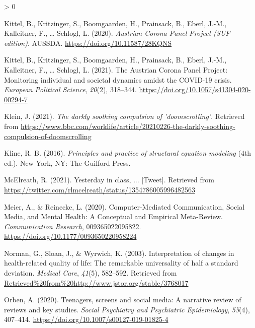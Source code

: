 \documentclass[
  english,
  man,mask,floatsintext]{apa6}
\newlength{\cslhangindent}
\newenvironment{CSLReferences}[2] %
 {%
  \setlength{\parindent}{0pt}
  \ifodd #1 \everypar{\setlength{\hangindent}{\cslhangindent}}\ignorespaces\fi
  \ifnum #2 > 0
  \setlength{\parskip}{#2\baselineskip}
  \fi
 }%
 {}
\begin{document}
\begin{CSLReferences}{1}{0}
\leavevmode\hypertarget{ref-kittelAustrianCoronaPanel2020}{}%
Kittel, B., Kritzinger, S., Boomgaarden, H., Prainsack, B., Eberl, J.-M., Kalleitner, F., \ldots{} Schlogl, L. (2020). \emph{Austrian {Corona} {Panel} {Project} ({SUF} edition)}. AUSSDA. \url{https://doi.org/10.11587/28KQNS}

\leavevmode\hypertarget{ref-kittelAustrianCoronaPanel2021}{}%
Kittel, B., Kritzinger, S., Boomgaarden, H., Prainsack, B., Eberl, J.-M., Kalleitner, F., \ldots{} Schlogl, L. (2021). The {Austrian} {Corona} {Panel} {Project}: Monitoring individual and societal dynamics amidst the {COVID}-19 crisis. \emph{European Political Science}, \emph{20}(2), 318--344. \url{https://doi.org/10.1057/s41304-020-00294-7}

\leavevmode\hypertarget{ref-kleinDarklySoothingCompulsion2021}{}%
Klein, J. (2021). \emph{The darkly soothing compulsion of 'doomscrolling'}. Retrieved from \url{https://www.bbc.com/worklife/article/20210226-the-darkly-soothing-compulsion-of-doomscrolling}

\leavevmode\hypertarget{ref-klinePrinciplesPracticeStructural2016}{}%
Kline, R. B. (2016). \emph{Principles and practice of structural equation modeling} (4th ed.). New York, NY: The Guilford Press.

\leavevmode\hypertarget{ref-mcelreathYesterdayClass2021}{}%
McElreath, R. (2021). Yesterday in class, ... {[}Tweet{]}. Retrieved from \url{https://twitter.com/rlmcelreath/status/1354786005996482563}

\leavevmode\hypertarget{ref-meierComputerMediatedCommunicationSocial2020}{}%
Meier, A., \& Reinecke, L. (2020). Computer-{Mediated} {Communication}, {Social} {Media}, and {Mental} {Health}: {A} {Conceptual} and {Empirical} {Meta}-{Review}. \emph{Communication Research}, 009365022095822. \url{https://doi.org/10.1177/0093650220958224}

\leavevmode\hypertarget{ref-normanInterpretationChangesHealthrelated2003}{}%
Norman, G., Sloan, J., \& Wyrwich, K. (2003). Interpretation of changes in health-related quality of life: {The} remarkable universality of half a standard deviation. \emph{Medical Care}, \emph{41}(5), 582--592. Retrieved from \url{Retrieved\%20from\%20http://www.jstor.org/stable/3768017}

\leavevmode\hypertarget{ref-orbenTeenagersScreensSocial2020}{}%
Orben, A. (2020). Teenagers, screens and social media: A narrative review of reviews and key studies. \emph{Social Psychiatry and Psychiatric Epidemiology}, \emph{55}(4), 407--414. \url{https://doi.org/10.1007/s00127-019-01825-4}


\end{CSLReferences}
\end{document}

